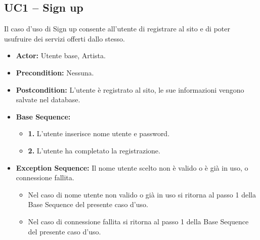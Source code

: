 \subsection{UC1 -- Sign up}
Il caso d'uso di Sign up consente all'utente di registrare al sito 
e di poter usufruire dei servizi offerti dallo stesso. 
\begin{itemize}
    \item \textbf{Actor:} Utente base, Artista.
    \item \textbf{Precondition:} Nessuna.
    \item \textbf{Postcondition:} L'utente è registrato al sito, le sue informazioni vengono salvate nel database.
    \item \textbf{Base Sequence:} 
        \begin{itemize}
            \item \textbf{1.} L'utente inserisce nome utente e password.
            \item \textbf{2.} L'utente ha completato la registrazione.
        \end{itemize}
    \item \textbf{Exception Sequence:} Il nome utente scelto non è valido o è già in uso, o connessione fallita.
        \begin{itemize}
            \item Nel caso di nome utente non valido o già in uso si ritorna al passo 1 della Base Sequence del presente caso d'uso.
            \item Nel caso di connessione fallita si ritorna al passo 1 della Base Sequence del presente caso d'uso. 
        \end{itemize}
    
\end{itemize}
\vspace{1cm}

